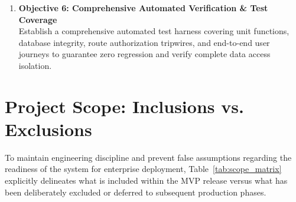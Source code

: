 \documentclass[11pt,a4paper,oneside]{report}
\begin{document}
\begin{enumerate}
  \item \textbf{Objective 6: Comprehensive Automated Verification \& Test Coverage}\\
  Establish a comprehensive automated test harness covering unit functions, database integrity, route authorization tripwires, and end-to-end user journeys to guarantee zero regression and verify complete data access isolation.
\end{enumerate}

\section{Project Scope: Inclusions vs. Exclusions}
To maintain engineering discipline and prevent false assumptions regarding the readiness of the system for enterprise deployment, Table~\ref{tab:scope_matrix} explicitly delineates what is included within the MVP release versus what has been deliberately excluded or deferred to subsequent production phases.
\end{document}
